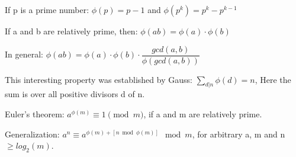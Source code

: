 If p is a prime number: $\phi (p) = p - 1$ and $\phi(p^k) = p^k - p^{k-1}$

If a and b are relatively prime, then: $\phi(a b) = \phi(a) \cdot \phi(b)$

In general: $\phi(ab) = \phi(a) \cdot \phi(b) \cdot \dfrac{gcd(a, b)}{\phi(gcd(a, b))}$

This interesting property was established by Gauss: $\sum_{d|n} \phi{(d)} = n$, Here the sum is over all positive divisors d of n.

Euler's theorem: $a^{\phi(m)} \equiv 1 \pmod m$, if a and m are relatively prime.

Generalization: $a^{n}\equiv a^{\phi(m)+[n \bmod \phi(m)]} \mod m$, for arbitrary a, m and n $\ge log_2(m)$.
